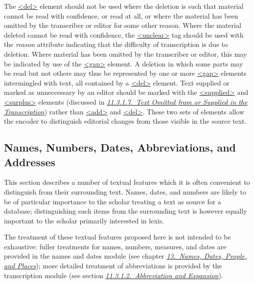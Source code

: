 The \hyperref[TEI.del]{<del>} element should not be used where the deletion is such that material cannot be read with confidence, or read at all, or where the material has been omitted by the transcriber or editor for some other reason. Where the material deleted cannot be read with confidence, the \hyperref[TEI.unclear]{<unclear>} tag should be used with the {\itshape reason} attribute indicating that the difficulty of transcription is due to deletion. Where material has been omitted by the transcriber or editor, this may be indicated by use of the \hyperref[TEI.gap]{<gap>} element. A deletion in which some parts may be read but not others may thus be represented by one or more \hyperref[TEI.gap]{<gap>} elements intermingled with text, all contained by a \hyperref[TEI.del]{<del>} element. Text supplied or marked as unneccessary by an editor should be marked with the \hyperref[TEI.supplied]{<supplied>} and \hyperref[TEI.surplus]{<surplus>} elements (discussed in \textit{\hyperref[PHOM]{11.3.1.7.\ Text Omitted from or Supplied in the Transcription}}) rather than \hyperref[TEI.add]{<add>} and \hyperref[TEI.del]{<del>}. These two sets of elements allow the encoder to distinguish editorial changes from those visible in the source text.
\subsection[{Names, Numbers, Dates, Abbreviations, and Addresses}]{Names, Numbers, Dates, Abbreviations, and Addresses}\label{CONA}\par
This section describes a number of textual features which it is often convenient to distinguish from their surrounding text. Names, dates, and numbers are likely to be of particular importance to the scholar treating a text as source for a database; distinguishing such items from the surrounding text is however equally important to the scholar primarily interested in lexis.\par
The treatment of these textual features proposed here is not intended to be exhaustive: fuller treatments for names, numbers, measures, and dates are provided in the names and dates module (see chapter \textit{\hyperref[ND]{13.\ Names, Dates, People, and Places}}); more detailed treatment of abbreviations is provided by the transcription module (see section \textit{\hyperref[PHAB]{11.3.1.2.\ Abbreviation and Expansion}}).
